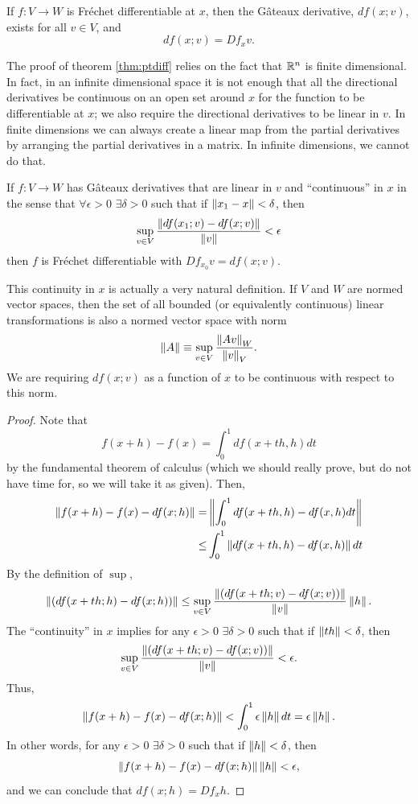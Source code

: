\begin{lemma}\label{lem:fregat}
  If $f: V \to W$ is Fr\'{e}chet differentiable at $x$, then the
  G\^{a}teaux derivative, $df(x;v)$, exists for all $v \in V$, and
  \[ df(x;v) = Df_x v. \]
\end{lemma}
The proof of theorem \ref{thm:ptdiff} relies on the fact that $\mathbb{R}^n$
is finite dimensional. In fact, in an infinite dimensional space it is
not enough that all the directional derivatives be continuous on an
open set around $x$ for the function to be differentiable at $x$; we
also require the directional derivatives to be linear in $v$. In
finite dimensions we can always create a linear map from the partial
derivatives by arranging the partial derivatives in a matrix. In
infinite dimensions, we cannot do that. 
\begin{lemma}\label{lem:gatfre}
  If $f: V \to W$ has G\^{a}teaux derivatives that are linear in $v$
  and ``continuous'' in $x$ in the sense that $\forall \epsilon>0$
  $\exists \delta > 0$ such that if $\left\Vert {x_1 - x} \right\Vert < \delta$, then
  \begin{align*}
    \sup_{v \in V} \frac{\left\Vert {df(x_1;v) - df(x;v)} \right\Vert}{\left\Vert {v} \right\Vert} < \epsilon
  \end{align*}
  then $f$ is Fr\'{e}chet differentiable with $Df_{x_0} v = df(x;v)$.
\end{lemma}
\begin{remark}
  This continuity in $x$ is actually a very natural definition. If $V$
  and $W$ are normed vector spaces, then the set of all bounded (or
  equivalently continuous) linear transformations is also a normed
  vector space with norm 
  \[ \left\Vert {A} \right\Vert \equiv \sup_{v \in V} \frac{\left\Vert {Av} \right\Vert_W}{\left\Vert {v} \right\Vert_V}. \]
  We are requiring $df(x;v)$ as a function of $x$ to be continuous with 
  respect to this norm. 
\end{remark}
\begin{proof}
  Note that
  \[ f(x+h) - f(x) = \int_0^1 df(x+th,h) dt \]
  by the fundamental theorem of calculus (which we should really
  prove, but do not have time for, so we will take it as given). Then,
  \begin{align*}
    \left\Vert { f(x+h) - f(x) - df(x;h)} \right\Vert = & \left\Vert { \int_0^1 df(x+th,h) -
      df(x,h) dt} \right\Vert \\
    \leq & \int_0^1 \left\Vert {df(x+th,h) -df(x,h)} \right\Vert dt
  \end{align*}
  By the definition of $\sup$, 
  \[ \left\Vert {\left(df(x+th;h) - df(x;h) \right)} \right\Vert \leq \sup_{v \in V}
  \frac{\left\Vert {\left(df(x+th;v) - df(x;v)
      \right)} \right\Vert}{\left\Vert {v} \right\Vert}\left\Vert {h} \right\Vert. \] 
  The ``continuity'' in $x$ implies for any $\epsilon>0$ $\exists
  \delta > 0$ such that if $\left\Vert {th} \right\Vert < \delta$, then 
  \[ \sup_{v \in V}
  \frac{\left\Vert {\left(df(x+th;v) - df(x;v) \right)} \right\Vert}{\left\Vert {v} \right\Vert} <
  \epsilon. \]
  Thus,
  \[ 
  \left\Vert { f(x+h) - f(x) - df(x;h)} \right\Vert < \int_0^1 \epsilon \left\Vert {h} \right\Vert dt =
  \epsilon \left\Vert {h} \right\Vert. \]
  In other words, for any $\epsilon>0$ $\exists \delta>0$ such that
  if $\left\Vert {h} \right\Vert < \delta$, then 
  \[ \left\Vert {f(x+h) - f(x) - df(x;h)} \right\Vert{\left\Vert {h} \right\Vert}< \epsilon, \]
  and we can conclude that $df(x;h) = Df_x h$. 
\end{proof}
